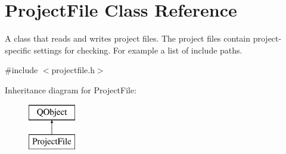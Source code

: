 \hypertarget{class_project_file}{\section{Project\-File Class Reference}
\label{class_project_file}
}


A class that reads and writes project files. The project files contain project-\/specific settings for checking. For example a list of include paths.  




{\ttfamily \#include $<$projectfile.\-h$>$}

Inheritance diagram for Project\-File\-:\begin{figure}[H]
\begin{center}
\leavevmode
\includegraphics[height=2.000000cm]{class_project_file}
\end{center}
\end{figure}
